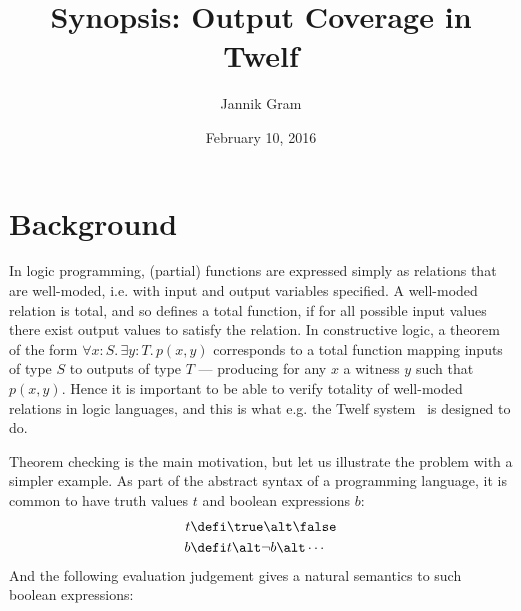 \documentclass[12pt]{article}
\begin{document}
\title{Synopsis: Output Coverage in Twelf}
\author{Jannik Gram}
\date{February 10, 2016}

\maketitle

\section*{Background}

In logic programming, (partial) functions are expressed simply as relations that are well-moded, i.e. with input and output variables specified.
A well-moded relation is total, and so defines a total function, if for all possible input values there exist output values to satisfy the relation.
In constructive logic, a theorem of the form $\forall x{:}S . \, \exists y{:}T . \, p(x, y)$ corresponds to a total function mapping inputs of type $S$ to outputs of type $T$ --- producing for any $x$ a witness $y$ such that $p(x, y)$.
Hence it is important to be able to verify totality of well-moded relations in logic languages, and this is what e.g. the Twelf system~\cite{PfenningSchurmann99} is designed to do.

Theorem checking is the main motivation, but let us illustrate the problem with a simpler example.
As part of the abstract syntax of a programming language, it is common to have truth values $t$ and boolean expressions $b$:
\begin{align*}
  t &\defi \true \alt \false \\
  b &\defi t \alt \neg{b} \alt \cdots
\end{align*}
And the following evaluation judgement gives a natural semantics to such boolean expressions:

{ %
\vspace{0.5cm}
\noindent {}

\begin{prooftree}
\end{prooftree}

\begin{prooftree}
\end{prooftree}

\begin{prooftree}
\end{prooftree}

\centering{$\vdots$}

\vspace{0.5cm}
}
\end{document}
